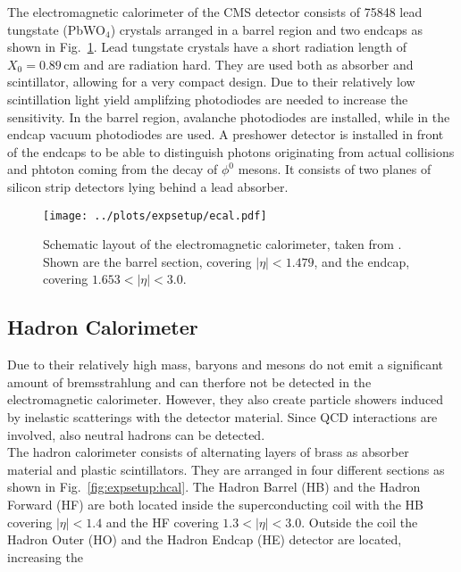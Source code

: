 \noindent The electromagnetic calorimeter of the CMS detector consists of 75848 lead tungstate (PbWO$_4$) crystals arranged in a barrel region and two endcaps as shown in Fig.~\ref{fig:expsetup:ecal}. Lead tungstate crystals have a short radiation length of $X_0=0.89$\,cm and are radiation hard. They are used both as absorber and scintillator, allowing for a very compact design. Due to their relatively low scintillation light yield amplifzing photodiodes are needed to increase the sensitivity. In the barrel region, avalanche photodiodes are installed, while in the endcap vacuum photodiodes are used. A preshower detector is installed in front of the endcaps to be able to distinguish photons originating from actual collisions and phtoton coming from the decay of $\phi^0$ mesons. It consists of two planes of silicon strip detectors lying behind a lead absorber.
\begin{figure}
    \centering
    \texttt{[image: ../plots/expsetup/ecal.pdf]}
    \caption[Schematic layout of the electromagnetic calorimeter]{Schematic layout of the electromagnetic calorimeter, taken from \cite{CMS_design}. Shown are the barrel section, covering $|\eta|<1.479$, and the endcap, covering $1.653<|\eta|<3.0$. }
    \label{fig:expsetup:ecal}
\end{figure}
\subsection*{Hadron Calorimeter}
Due to their relatively high mass, baryons and mesons do not emit a significant amount of bremsstrahlung and can therfore not be detected in the electromagnetic calorimeter. However, they also create particle showers induced by inelastic scatterings with the detector material. Since QCD interactions are involved, also neutral hadrons can be detected.\\

\noindent The hadron calorimeter consists of alternating layers of brass as absorber material and plastic scintillators. They are arranged in four different sections as shown in Fig.~\ref{fig:expsetup:hcal}. The Hadron Barrel (HB) and the Hadron Forward (HF) are both located inside the superconducting coil with the HB covering $|\eta|<1.4$ and the HF covering $1.3<|\eta|<3.0$. 
Outside the coil the Hadron Outer (HO) and the Hadron Endcap (HE) detector are located, increasing the 


